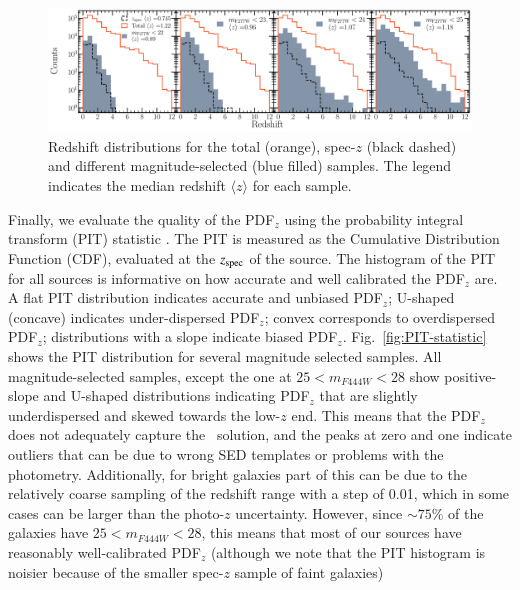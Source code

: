 \documentclass[longauth]{aa}
\begin{document}
\begin{figure}[t!]
\includegraphics[width=1\textwidth]{figures/redshift_distributions.pdf}
\caption{Redshift distributions for the total (orange), spec-$z$ (black dashed) and different magnitude-selected (blue filled) samples. The legend indicates the median redshift $\langle z \rangle$ for each sample.}
\label{fig:z-distributions}
\end{figure}




Finally, we evaluate the quality of the PDF$_z$ using the probability integral transform (PIT) statistic \citep{Bordoloi2010}. The PIT is measured as the Cumulative Distribution Function (CDF), evaluated at the $z_{\rm spec}$ of the source. The histogram of the PIT for all sources is informative on how accurate and well calibrated the PDF$_z$ are. A flat PIT distribution indicates accurate and unbiased PDF$_z$; U-shaped (concave) indicates under-dispersed PDF$_z$; convex corresponds to overdispersed PDF$_z$; distributions with a slope indicate biased PDF$_z$. Fig.~\ref{fig:PIT-statistic} shows the PIT distribution for several magnitude selected samples. All magnitude-selected samples, except the one at $25 < m_{F444W} < 28$ show positive-slope and U-shaped distributions indicating PDF$_z$ that are slightly underdispersed and skewed towards the low-$z$ end.  This means that the PDF$_z$ does not adequately capture the \zspec\ solution, and the peaks at zero and one indicate outliers that can be due to wrong SED templates or problems with the photometry. Additionally, for bright galaxies part of this can be due to the relatively coarse sampling of the redshift range with a step of 0.01, which in some cases can be larger than the photo-$z$ uncertainty. However, since $\sim 75 \%$ of the galaxies have $25 < m_{F444W} < 28$, this means that most of our sources have reasonably well-calibrated PDF$_z$ (although we note that the PIT histogram is noisier because of the smaller spec-$z$ sample of faint galaxies)
\end{document}
